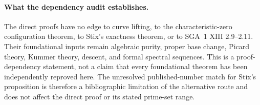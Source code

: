 \paragraph{What the dependency audit establishes.}
The direct proofs have no edge to curve lifting, to the
characteristic-zero configuration theorem, to Stix's exactness
theorem, or to SGA~1 XIII 2.9--2.11. Their foundational inputs
remain algebraic purity, proper base change, Picard theory,
Kummer theory, descent, and formal spectral sequences. This is
a proof-dependency statement, not a claim that every foundational
theorem has been independently reproved here. The unresolved
published-number match for Stix's proposition is therefore a
bibliographic limitation of the alternative route and does not
affect the direct proof or its stated prime-set range.
